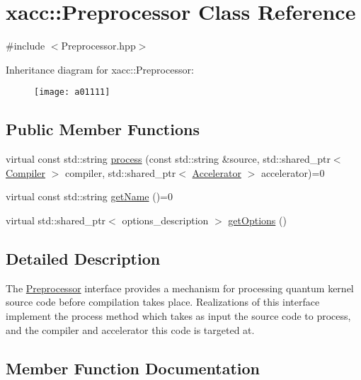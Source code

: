 \hypertarget{a01111}{}\section{xacc\+:\+:Preprocessor Class Reference}
\label{a01111}


{\ttfamily \#include $<$Preprocessor.\+hpp$>$}

Inheritance diagram for xacc\+:\+:Preprocessor\+:\begin{figure}[H]
\begin{center}
\leavevmode
\texttt{[image: a01111]}
\end{center}
\end{figure}
\subsection*{Public Member Functions}
\begin{DoxyCompactItemize}
\item 
virtual const std\+::string \hyperlink{a01111_ae59b5a2963f8bcc84b590a83f4749e19}{process} (const std\+::string \&source, std\+::shared\+\_\+ptr$<$ \hyperlink{a01103}{Compiler} $>$ compiler, std\+::shared\+\_\+ptr$<$ \hyperlink{a01087}{Accelerator} $>$ accelerator)=0
\item 
virtual const std\+::string \hyperlink{a01111_a36671f4c062d61e230306edc404774cd}{get\+Name} ()=0
\item 
virtual std\+::shared\+\_\+ptr$<$ options\+\_\+description $>$ \hyperlink{a01111_a96f5600ea47628b66917c7b90250e7f1}{get\+Options} ()
\end{DoxyCompactItemize}


\subsection{Detailed Description}
The \hyperlink{a01111}{Preprocessor} interface provides a mechanism for processing quantum kernel source code before compilation takes place. Realizations of this interface implement the process method which takes as input the source code to process, and the compiler and accelerator this code is targeted at. 

\subsection{Member Function Documentation}
\mbox{\label{a01111_a36671f4c062d61e230306edc404774cd}} 
